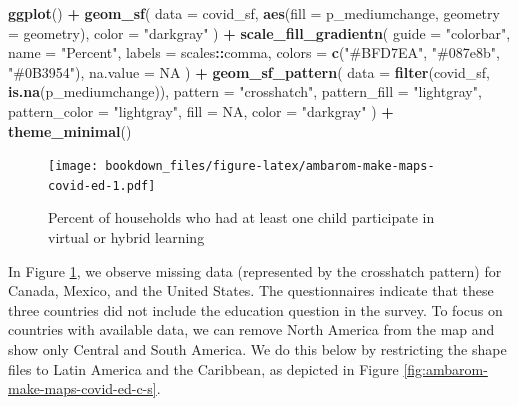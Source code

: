 \documentclass[
]{krantz}
\makeatletter
\newenvironment{Shaded}{\begin{snugshade}}{\end{snugshade}}
\newcommand{\AttributeTok}[1]{\textcolor[rgb]{0.27,0.27,0.27}{#1}}
\newcommand{\ConstantTok}[1]{\textcolor[rgb]{0.37,0.37,0.37}{#1}}
\newcommand{\FunctionTok}[1]{\textcolor[rgb]{0.27,0.27,0.27}{\textbf{#1}}}
\newcommand{\NormalTok}[1]{#1}
\newcommand{\SpecialCharTok}[1]{\textcolor[rgb]{0.43,0.43,0.43}{\textbf{#1}}}
\newcommand{\StringTok}[1]{\textcolor[rgb]{0.5,0.5,0.5}{#1}}
\newenvironment{kframe}{%
\medskip{}
\setlength{\fboxsep}{.8em}
 \def\at@end@of@kframe{}%
 \ifinner\ifhmode%
  \def\at@end@of@kframe{\end{minipage}}%
  \begin{minipage}{\columnwidth}%
 \fi\fi%
 \def\FrameCommand##1{\hskip\@totalleftmargin \hskip-\fboxsep
 \colorbox{shadecolor}{##1}\hskip-\fboxsep
     \hskip-\linewidth \hskip-\@totalleftmargin \hskip\columnwidth}%
 \MakeFramed {\advance\hsize-\width
   \@totalleftmargin\z@ \linewidth\hsize
   \@setminipage}}%
 {\par\unskip\endMakeFramed%
 \at@end@of@kframe}
\renewenvironment{Shaded}{\begin{kframe}}{\end{kframe}}
\makeatother
\begin{document}
\begin{Shaded}
\begin{Highlighting}[]
\FunctionTok{ggplot}\NormalTok{() }\SpecialCharTok{+}
  \FunctionTok{geom\_sf}\NormalTok{(}
    \AttributeTok{data =}\NormalTok{ covid\_sf,}
    \FunctionTok{aes}\NormalTok{(}\AttributeTok{fill =}\NormalTok{ p\_mediumchange, }\AttributeTok{geometry =}\NormalTok{ geometry),}
    \AttributeTok{color =} \StringTok{"darkgray"}
\NormalTok{  ) }\SpecialCharTok{+}
  \FunctionTok{scale\_fill\_gradientn}\NormalTok{(}
    \AttributeTok{guide =} \StringTok{"colorbar"}\NormalTok{,}
    \AttributeTok{name =} \StringTok{"Percent"}\NormalTok{,}
    \AttributeTok{labels =}\NormalTok{ scales}\SpecialCharTok{::}\NormalTok{comma,}
    \AttributeTok{colors =} \FunctionTok{c}\NormalTok{(}\StringTok{"\#BFD7EA"}\NormalTok{, }\StringTok{"\#087e8b"}\NormalTok{, }\StringTok{"\#0B3954"}\NormalTok{),}
    \AttributeTok{na.value =} \ConstantTok{NA}
\NormalTok{  ) }\SpecialCharTok{+}
  \FunctionTok{geom\_sf\_pattern}\NormalTok{(}
    \AttributeTok{data =} \FunctionTok{filter}\NormalTok{(covid\_sf, }\FunctionTok{is.na}\NormalTok{(p\_mediumchange)),}
    \AttributeTok{pattern =} \StringTok{"crosshatch"}\NormalTok{,}
    \AttributeTok{pattern\_fill =} \StringTok{"lightgray"}\NormalTok{,}
    \AttributeTok{pattern\_color =} \StringTok{"lightgray"}\NormalTok{,}
    \AttributeTok{fill =} \ConstantTok{NA}\NormalTok{,}
    \AttributeTok{color =} \StringTok{"darkgray"}
\NormalTok{  ) }\SpecialCharTok{+}
  \FunctionTok{theme\_minimal}\NormalTok{()}
\end{Highlighting}
\end{Shaded}

\begin{figure}
\centering
\texttt{[image: bookdown\_files/figure-latex/ambarom-make-maps-covid-ed-1.pdf]}
\caption{\label{fig:ambarom-make-maps-covid-ed}Percent of households who had at least one child participate in virtual or hybrid learning}
\end{figure}

In Figure \ref{fig:ambarom-make-maps-covid-ed}, we observe missing data (represented by the crosshatch pattern) for Canada, Mexico, and the United States. The questionnaires indicate that these three countries did not include the education question in the survey. To focus on countries with available data, we can remove North America from the map and show only Central and South America. We do this below by restricting the shape files to Latin America and the Caribbean, as depicted in Figure \ref{fig:ambarom-make-maps-covid-ed-c-s}.
\end{document}
